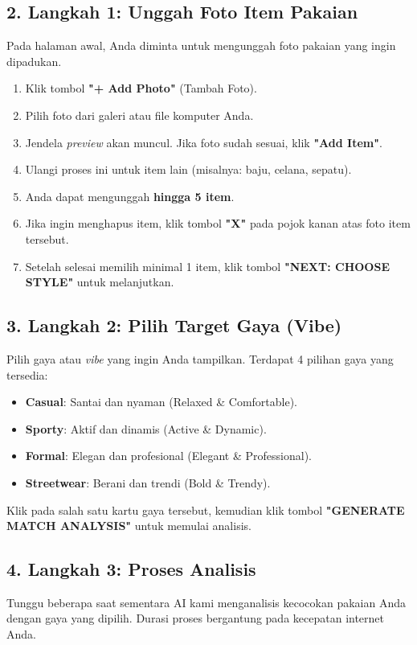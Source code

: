 \documentclass[a4paper,12pt]{article}
\begin{document}
\subsection{2. Langkah 1: Unggah Foto Item Pakaian}
Pada halaman awal, Anda diminta untuk mengunggah foto pakaian yang ingin dipadukan.
\begin{enumerate}
    \item Klik tombol \textbf{"+ Add Photo"} (Tambah Foto).
    \item Pilih foto dari galeri atau file komputer Anda.
    \item Jendela \textit{preview} akan muncul. Jika foto sudah sesuai, klik \textbf{"Add Item"}.
    \item Ulangi proses ini untuk item lain (misalnya: baju, celana, sepatu).
    \item Anda dapat mengunggah \textbf{hingga 5 item}.
    \item Jika ingin menghapus item, klik tombol \textbf{"X"} pada pojok kanan atas foto item tersebut.
    \item Setelah selesai memilih minimal 1 item, klik tombol \textbf{"NEXT: CHOOSE STYLE"} untuk melanjutkan.
\end{enumerate}

\subsection{3. Langkah 2: Pilih Target Gaya (Vibe)}
Pilih gaya atau \textit{vibe} yang ingin Anda tampilkan. Terdapat 4 pilihan gaya yang tersedia:
\begin{itemize}
    \item \textbf{Casual}: Santai dan nyaman (Relaxed \& Comfortable).
    \item \textbf{Sporty}: Aktif dan dinamis (Active \& Dynamic).
    \item \textbf{Formal}: Elegan dan profesional (Elegant \& Professional).
    \item \textbf{Streetwear}: Berani dan trendi (Bold \& Trendy).
\end{itemize}
Klik pada salah satu kartu gaya tersebut, kemudian klik tombol \textbf{"GENERATE MATCH ANALYSIS"} untuk memulai analisis.

\subsection{4. Langkah 3: Proses Analisis}
Tunggu beberapa saat sementara AI kami menganalisis kecocokan pakaian Anda dengan gaya yang dipilih. Durasi proses bergantung pada kecepatan internet Anda.
\end{document}
